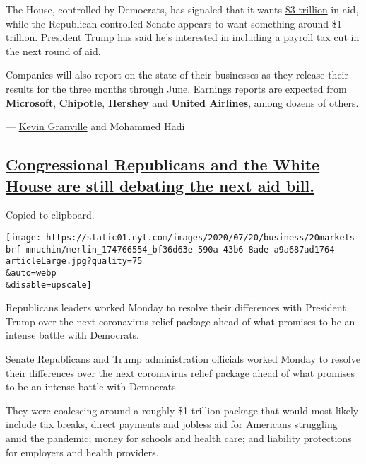 The House, controlled by Democrats, has signaled that it wants
\href{https://www.nytimes.com/2020/05/15/us/politics/house-simulus-vote.html}{\$3
trillion} in aid, while the Republican-controlled Senate appears to want
something around \$1 trillion. President Trump has said he's interested
in including a payroll tax cut in the next round of aid.

Companies will also report on the state of their businesses as they
release their results for the three months through June. Earnings
reports are expected from \textbf{Microsoft}, \textbf{Chipotle},
\textbf{Hershey} and \textbf{United Airlines}, among dozens of others.

--- \href{https://www.nytimes.com/by/kevin-granville}{Kevin Granville}
and Mohammed Hadi

\hypertarget{congressional-republicans-and-the-white-house-are-still-debating-the-next-aid-bill}{%
\subsection{\texorpdfstring{\protect\hyperlink{congressional-republicans-and-the-white-house-are-still-debating-the-next-aid-bill}{Congressional
Republicans and the White House are still debating the next aid
bill.}}{Congressional Republicans and the White House are still debating the next aid bill.}}\label{congressional-republicans-and-the-white-house-are-still-debating-the-next-aid-bill}}

Copied to clipboard.

\texttt{[image: https://static01.nyt.com/images/2020/07/20/business/20markets-brf-mnuchin/merlin\_174766554\_bf36d63e-590a-43b6-8ade-a9a687ad1764-articleLarge.jpg?quality=75\\\&auto=webp\\\&disable=upscale]}

Republicans leaders worked Monday to resolve their differences with
President Trump over the next coronavirus relief package ahead of what
promises to be an intense battle with Democrats.

Senate Republicans and Trump administration officials worked Monday to
resolve their differences over the next coronavirus relief package ahead
of what promises to be an intense battle with Democrats.

They were coalescing around a roughly \$1 trillion package that would
most likely include tax breaks, direct payments and jobless aid for
Americans struggling amid the pandemic; money for schools and health
care; and liability protections for employers and health providers.

